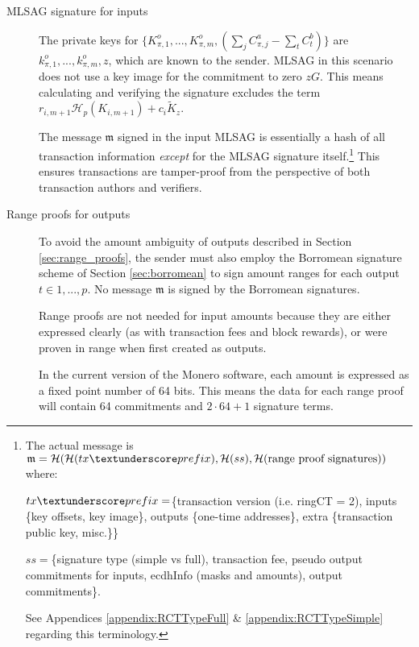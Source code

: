 \begin{description}%
	
	\item [MLSAG signature for inputs]
	The private keys for 
	\(\{K_{\pi,1}^o,...,K_{\pi,m}^o, (\sum\limits_j C_{\pi, j}^a - \sum\limits_t C^b_{t})\}\)
	are \(k_{\pi,1}^o,...,k_{\pi,m}^o, z\), which are known to the sender. 
	MLSAG in this scenario does not use a key image for the commitment to zero $z G$. This means calculating and verifying the signature excludes the term $r_{i,m+1} \mathcal{H}_p(K_{i,m+1}) + c_i \tilde{K}_z$.
	
	The message $\mathfrak{m}$ signed in the input MLSAG is essentially a hash of all transaction information {\em except} for the MLSAG signature itself.\footnote{\label{MLSAG_message}The actual message is $\mathfrak{m} = \mathcal{H}(\mathcal{H}(tx\textunderscore prefix),\mathcal{H}(ss),\mathcal{H}(\text{range proof signatures}))$ where:\par
	$tx\textunderscore prefix = $\{transaction version (i.e. ringCT = 2), inputs \{key offsets, key image\}, outputs \{one-time addresses\}, extra \{transaction public key, misc.\}\}\par
	$ss = $\{signature type (simple vs full), transaction fee, pseudo output commitments for inputs, ecdhInfo (masks and amounts), output commitments\}.\par
	See Appendices \ref{appendix:RCTTypeFull} \& \ref{appendix:RCTTypeSimple} regarding this terminology.} This ensures transactions are tamper-proof from the perspective of both transaction authors and verifiers.
	
	\item[Range proofs for outputs]
	To avoid the amount ambiguity of outputs described in Section  \ref{sec:range_proofs}, the sender must also employ the Borromean signature scheme of Section \ref{sec:borromean} to sign amount ranges for each output $t \in {1, ..., p}$. No message $
\mathfrak{m}$ is signed by the Borromean signatures.
	
	Range proofs are not needed for input amounts because they are either expressed clearly (as with transaction fees and block rewards), or were proven in range when first created as outputs.
	
	In the current version of the Monero software, each amount is expressed as a fixed point number of 64 bits. This means the data for each range proof will contain 64 commitments and $2 \cdot 64 + 1$ signature terms.
	
\end{description}


